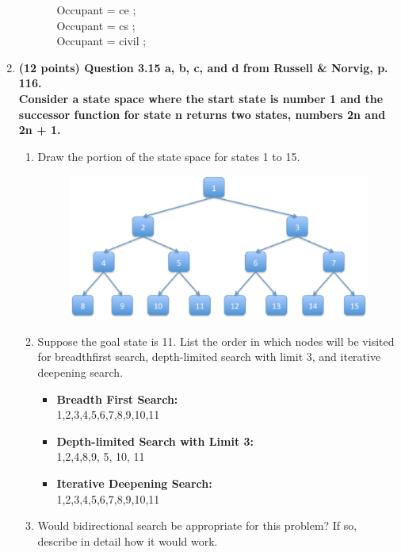\documentclass{article}%
\begin{document}
\begin{enumerate}
\begin{enumerate}
\begin{itemize}
		Occupant = ce ; \\

		Occupant = cs ; \\

		Occupant = civil ; 
		
		\end{itemize}

	\end{enumerate}



\item \textbf{(12 points) Question 3.15 a, b, c, and d from Russell \& Norvig, p. 116. \\
Consider a state space where the start state is number 1 and the successor function for
state n returns two states, numbers 2n and 2n + 1.}
	\begin{enumerate}
	\item Draw the portion of the state space for states 1 to 15.
	
	
\begin{figure}[h]
\centering
\includegraphics[scale=0.5, clip]{state1-15.eps} 
\vspace*{-2ex}
\end{figure}
	
	\item Suppose the goal state is 11. List the order in which nodes will be visited for breadthfirst
search, depth-limited search with limit 3, and iterative deepening search.

		\begin{itemize}
		\item \textbf{Breadth First Search:} \\
			1,2,3,4,5,6,7,8,9,10,11
		\item \textbf{Depth-limited Search with Limit 3:} \\
		    1,2,4,8,9, 5, 10, 11
		\item \textbf{Iterative Deepening Search:} \\
			1,2,3,4,5,6,7,8,9,10,11
		\end{itemize}
	\item Would bidirectional search be appropriate for this problem? If so, describe in detail
how it would work. \\


\end{enumerate}
\end{enumerate}
\end{document}
